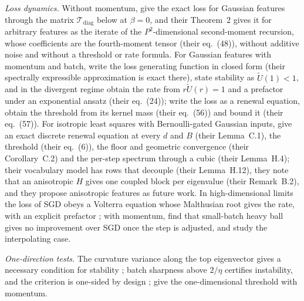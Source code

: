 \documentclass[11pt]{article}
\theoremstyle{remark}
\newcommand{\T}{\mathcal T}
\begin{document}
\emph{Loss dynamics.} Without momentum, \citet[Theorem~1]{bordelon2022learning} give the exact loss for Gaussian features through the matrix $\T_{\mathrm{diag}}$ below at $\beta=0$, and their Theorem~2 gives it for arbitrary features as the iterate of the $P^2$-dimensional second-moment recursion, whose coefficients are the fourth-moment tensor (their eq.~(48)), without additive noise and without a threshold or rate formula. For Gaussian features with momentum and batch, \citet{velikanov2023view} write the loss generating function in closed form (their spectrally expressible approximation is exact there), state stability as $\widetilde U(1)<1$, and in the divergent regime obtain the rate from $r\widetilde U(r)=1$ and a prefactor under an exponential ansatz (their eq.~(24)); \citet[Appendix~B]{wang2026momentum} write the loss as a renewal equation, obtain the threshold from its kernel mass (their eq.~(56)) and bound it (their eq.~(57)). For isotropic least squares with Bernoulli-gated Gaussian inputs, \citet{everett2026sparse} give an exact discrete renewal equation at every $d$ and $B$ (their Lemma~C.1), the threshold (their eq.~(6)), the floor and geometric convergence (their Corollary~C.2) and the per-step spectrum through a cubic (their Lemma~H.4); their vocabulary model has rows that decouple (their Lemma~H.12), they note that an anisotropic $H$ gives one coupled block per eigenvalue (their Remark~B.2), and they propose anisotropic features as future work. In high-dimensional limits the loss of SGD obeys a Volterra equation whose Malthusian root gives the rate, with an explicit prefactor \citep[Theorem~E.2]{paquette2021sgd}; with momentum, \citet{paquette2021momentum} find that small-batch heavy ball gives no improvement over SGD once the step is adjusted, and \citet{lee2022minibatch} study the interpolating case.

\emph{One-direction tests.} The curvature variance along the top eigenvector gives a necessary condition for stability \citep[Proposition~9]{mulayoff2024exact}; batch sharpness above $2/\eta$ certifies instability, and the criterion is one-sided by design \citep[Theorem~1]{andreyev2024eoss}; \citet[eq.~(10)]{andreyev2026momentum} give the one-dimensional threshold with momentum.
\end{document}
